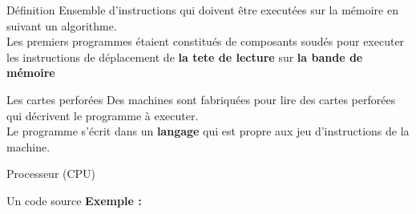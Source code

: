 \begin{frame}{Définition}
    Ensemble d'instructions qui doivent être executées sur la mémoire en suivant un algorithme. \\
    \newline
    Les premiers programmes étaient constitués de composants soudés pour executer les instructions de déplacement de \textbf{la tete de lecture} sur \textbf{la bande de mémoire}
\end{frame}

\begin{frame}{Les cartes perforées}
    Des machines sont fabriquées pour lire des cartes perforées qui décrivent le programme à executer. \\
    Le programme s'écrit dans un \textbf{langage} qui est propre aux jeu d'instructions de la machine.
\end{frame}

\begin{frame}{Processeur (CPU)}
\end{frame}

\begin{frame}{Un code source}
    \textbf{Exemple :}
\end{frame}




